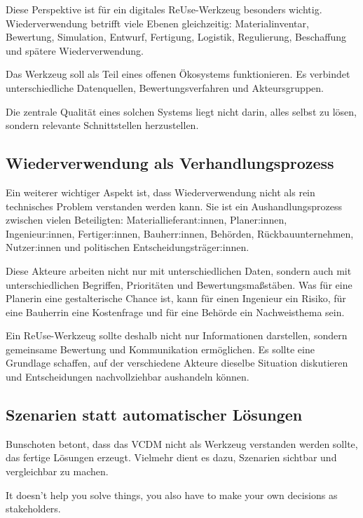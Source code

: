 Diese Perspektive ist für ein digitales ReUse-Werkzeug besonders wichtig. Wiederverwendung betrifft viele Ebenen gleichzeitig: Materialinventar, Bewertung, Simulation, Entwurf, Fertigung, Logistik, Regulierung, Beschaffung und spätere Wiederverwendung.

Das Werkzeug soll als Teil eines offenen Ökosystems funktionieren. Es verbindet unterschiedliche Datenquellen, Bewertungsverfahren und Akteursgruppen.

Die zentrale Qualität eines solchen Systems liegt nicht darin, alles selbst zu lösen, sondern relevante Schnittstellen herzustellen.

\subsection{Wiederverwendung als Verhandlungsprozess}

Ein weiterer wichtiger Aspekt ist, dass Wiederverwendung nicht als rein technisches Problem verstanden werden kann. Sie ist ein Aushandlungsprozess zwischen vielen Beteiligten: Materiallieferant:innen, Planer:innen, Ingenieur:innen, Fertiger:innen, Bauherr:innen, Behörden, Rückbauunternehmen, Nutzer:innen und politischen Entscheidungsträger:innen.

Diese Akteure arbeiten nicht nur mit unterschiedlichen Daten, sondern auch mit unterschiedlichen Begriffen, Prioritäten und Bewertungsmaßstäben. Was für eine Planerin eine gestalterische Chance ist, kann für einen Ingenieur ein Risiko, für eine Bauherrin eine Kostenfrage und für eine Behörde ein Nachweisthema sein.

Ein ReUse-Werkzeug sollte deshalb nicht nur Informationen darstellen, sondern gemeinsame Bewertung und Kommunikation ermöglichen. Es sollte eine Grundlage schaffen, auf der verschiedene Akteure dieselbe Situation diskutieren und Entscheidungen nachvollziehbar aushandeln können.

\subsection{Szenarien statt automatischer Lösungen}

Bunschoten betont, dass das VCDM nicht als Werkzeug verstanden werden sollte, das fertige Lösungen erzeugt. Vielmehr dient es dazu, Szenarien sichtbar und vergleichbar zu machen.

\begin{Blockquote}
It doesn't help you solve things, you also have to make your own decisions as stakeholders.
\end{Blockquote}


